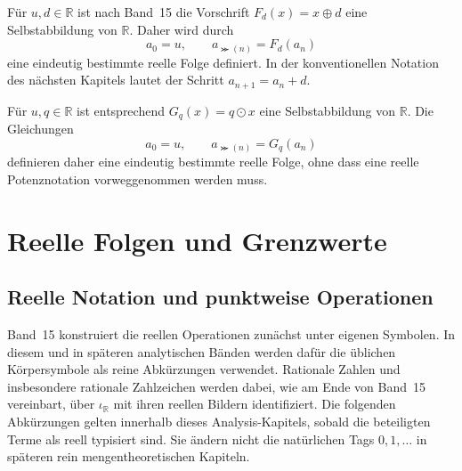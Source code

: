 \documentclass[main.tex]{subfiles}
\providecommand{\RealAdd}{\mathbin{\oplus}}
\providecommand{\RealMul}{\mathbin{\odot}}
\begin{document}
\begin{example}
Für \(u,d\in\mathbb R\) ist nach Band~15 die Vorschrift
\(F_d(x)=x\RealAdd d\) eine Selbstabbildung von \(\mathbb R\). Daher wird
durch
\[
  a_0=u,
  \qquad a_{\Succ(n)}=F_d(a_n)
\]
eine eindeutig bestimmte reelle Folge definiert. In der konventionellen
Notation des nächsten Kapitels lautet der Schritt \(a_{n+1}=a_n+d\).
\end{example}

\begin{example}
Für \(u,q\in\mathbb R\) ist entsprechend
\(G_q(x)=q\RealMul x\) eine Selbstabbildung von \(\mathbb R\). Die Gleichungen
\[
  a_0=u,
  \qquad a_{\Succ(n)}=G_q(a_n)
\]
definieren daher eine eindeutig bestimmte reelle Folge, ohne dass eine
reelle Potenznotation vorweggenommen werden muss.
\end{example}

\chapter{Reelle Folgen und Grenzwerte}

\section{Reelle Notation und punktweise Operationen}

Band~15 konstruiert die reellen Operationen zunächst unter eigenen Symbolen.
In diesem und in späteren analytischen Bänden werden dafür die üblichen
Körpersymbole als reine Abkürzungen verwendet. Rationale Zahlen und
insbesondere rationale Zahlzeichen werden dabei, wie am Ende von Band~15
vereinbart, über \(\iota_{\mathbb R}\) mit ihren reellen Bildern
identifiziert.
Die folgenden Abkürzungen gelten innerhalb dieses Analysis-Kapitels, sobald
die beteiligten Terme als reell typisiert sind. Sie ändern nicht die
natürlichen Tags \(0,1,\ldots\) in späteren rein mengentheoretischen Kapiteln.
\end{document}
